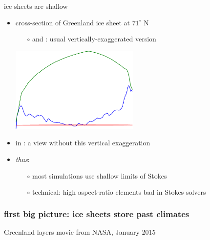 \documentclass[hide notes,intlimits]{beamer}
\begin{document}
\begin{frame}{ice sheets are shallow}

\begin{itemize}
\item cross-section of Greenland ice sheet at $71^\circ$ N
\small
  \begin{itemize}
  \item[$\circ$] {\color{dark green}{green}} and {\color{dark blue}{blue}}: usual vertically-exaggerated version
  \end{itemize}
  \begin{center}
    \includegraphics[width=0.5\textwidth]{newgreentrans}
  \end{center}
\normalsize
\item in {\color{dark red}{red}}: a view without this vertical exaggeration
\item \emph{thus}: 
  \begin{itemize}
  \item[$\circ$] most simulations use shallow limits of Stokes
  \item[$\circ$] technical: high aspect-ratio elements bad in Stokes solvers
  \end{itemize}
\end{itemize}
\end{frame}


\begin{frame}
  \frametitle{first big picture: ice sheets store past climates}
Greenland layers movie from NASA, January 2015
\end{frame}
\end{document}
